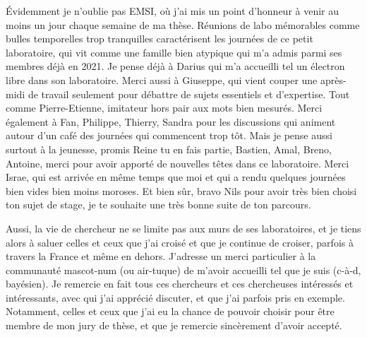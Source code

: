 \documentclass[a4paper]{book}
\begin{document}




Évidemment je n'oublie pas EMSI, 
où j'ai mis un point d'honneur à venir au moins un jour chaque semaine de ma thèse.
Réunions de labo mémorables comme bulles temporelles trop tranquilles caractérisent les journées de ce petit laboratoire, qui vit comme une famille bien atypique qui m'a admis parmi ses membres déjà en 2021.
Je pense déjà à Darius qui m'a accueilli tel un électron libre dans son laboratoire. %
Merci aussi à Giuseppe, qui vient couper une après-midi de travail seulement pour débattre de sujets essentiels et d'expertise. Tout comme Pierre-Etienne, imitateur hors pair aux mots bien mesurés.
Merci également à Fan, Philippe, Thierry, Sandra pour les discussions qui animent autour d'un café des journées qui commencent trop tôt.
Mais je pense aussi surtout à la jeunesse, promis Reine tu en fais partie, Bastien, Amal, Breno, Antoine, merci pour avoir apporté de nouvelles têtes dans ce laboratoire.
Merci Israe, qui est arrivée en même temps que moi et qui a rendu quelques journées bien vides bien moins moroses.
Et bien sûr, bravo Nils pour avoir très bien choisi ton sujet de stage, je te souhaite une très bonne suite de ton parcours. 




Aussi, la vie de chercheur ne se limite pas aux murs de ses laboratoires, et je tiens alors à saluer celles et ceux que j'ai croisé et que je continue de croiser, parfois à travers la France et même en dehors. 
J'adresse un merci particulier à la communauté mascot-num (ou air-tuque) de m'avoir accueilli tel que je suis (c-à-d, bayésien).
Je remercie en fait tous ces chercheurs et ces chercheuses intéressés et intéressants, avec qui j'ai apprécié discuter, et que j'ai parfois pris en exemple. Notamment, celles et  ceux que j'ai eu la chance de pouvoir choisir pour être membre de mon jury de thèse, et que je remercie sincèrement d'avoir accepté. 
\end{document}

